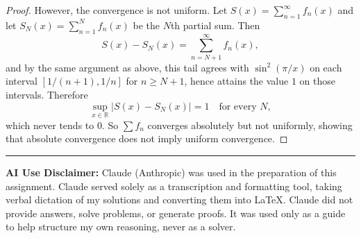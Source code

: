 \documentclass[12 pt]{article}
\begin{document}
\begin{proof}
However, the convergence is not uniform. Let $S(x) = \sum_{n=1}^{\infty} f_n(x)$ and let $S_N(x) = \sum_{n=1}^{N} f_n(x)$ be the $N$th partial sum. Then
$$
S(x) - S_N(x) = \sum_{n=N+1}^{\infty} f_n(x),
$$
and by the same argument as above, this tail agrees with $\sin^2(\pi/x)$ on each interval $[1/(n+1), 1/n]$ for $n \geq N+1$, hence attains the value $1$ on those intervals. Therefore
$$
\sup_{x \in \mathbb{R}} |S(x) - S_N(x)| = 1 \quad \text{for every } N,
$$
which never tends to $0$. So $\sum f_n$ converges absolutely but not uniformly, showing that absolute convergence does not imply uniform convergence.
\end{proof}

\vspace{2em}
\hrule
\vspace{1em}
\noindent\textbf{AI Use Disclaimer:} Claude (Anthropic) was used in the preparation of this assignment. Claude served solely as a transcription and formatting tool, taking verbal dictation of my solutions and converting them into \LaTeX. Claude did not provide answers, solve problems, or generate proofs. It was used only as a guide to help structure my own reasoning, never as a solver.
\end{document}
